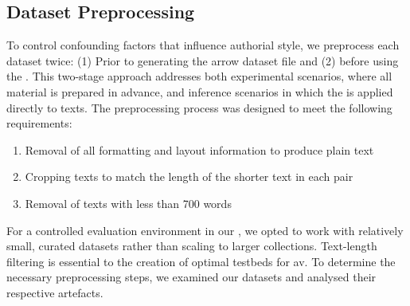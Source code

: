 
\subsection{Dataset Preprocessing}
\label{subsec:dataset_preprocessing}

To control confounding factors that influence authorial style, we preprocess each dataset twice:
(1) Prior to generating the arrow dataset file and (2) before using the \impAppr{}.
This two-stage approach addresses both experimental scenarios, where all material is prepared in advance, and inference scenarios in which the \impAppr{} is applied directly to texts.
The preprocessing process was designed to meet the following requirements:
\begin{enumerate}
    \item Removal of all formatting and layout information to produce plain text
    \item Cropping texts to match the length of the shorter text in each pair
    \item Removal of texts with less than 700 words
\end{enumerate}
For a controlled evaluation environment in our \impAppr{}, we opted to work with relatively small, curated datasets rather than scaling to larger collections.  
Text-length filtering is essential to the creation of optimal testbeds for \ac{av}.
To determine the necessary preprocessing steps, we examined our datasets and analysed their respective artefacts.


